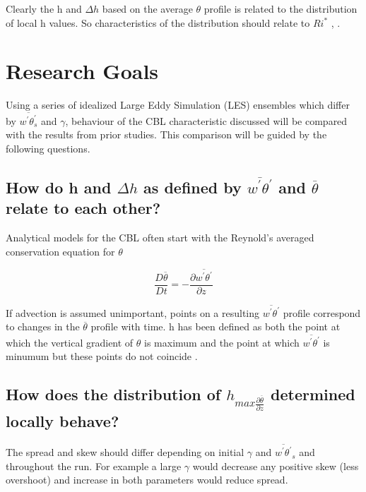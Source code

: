 Clearly the h and $\Delta h$ based on the average $\theta$ profile is related to the distribution of local h values. So characteristics of the distribution should relate to $Ri^{*}$ \cite{SullMoengStev}, \cite{BrooksFowler2}.  

\section{Research Goals}
\label{sec:ResearchGoals}

Using a series of idealized Large Eddy Simulation (LES) ensembles which differ by $\overline{w^{'}\theta^{'}_{s}}$ and $\gamma$, behaviour of the CBL characteristic discussed will be compared with the results from prior studies.   This comparison will be guided by the following questions.

\subsection{How do h and $\Delta h$ as defined by $\overline{w^{'} \theta^{'}}$ and $\overline{\theta}$  relate to each other?}

Analytical models for the CBL often start with the Reynold's averaged conservation equation for $\theta$ \cite{Deardorff79}

\begin{equation}
\frac{D \overline{\theta}}{Dt} = -\frac{\partial \overline{w^{'} \theta^{'}}}{\partial z}
\end{equation}

If advection is assumed unimportant, points on a resulting $\overline{w^{'} \theta^{'}}$ profile correspond to changes in the $\overline{\theta}$ profile with time.  h has been defined as both the point at which the vertical gradient of $\theta$ is maximum and the point at which $\overline{w^{'} \theta^{'}}$ is minumum but these points do not coincide \cite{SullMoengStev}.

\subsection{How does the distribution of $h_{max \frac{\partial \overline{\theta}}{\partial z}}$ determined locally behave?}
The spread and skew should differ depending on initial $\gamma$ and $\overline{w^{'}\theta^{'}}_{s}$ 
and throughout the run.  For example a large $\gamma$ would decrease any positive skew (less overshoot) 
and increase in both parameters would reduce spread.\\

